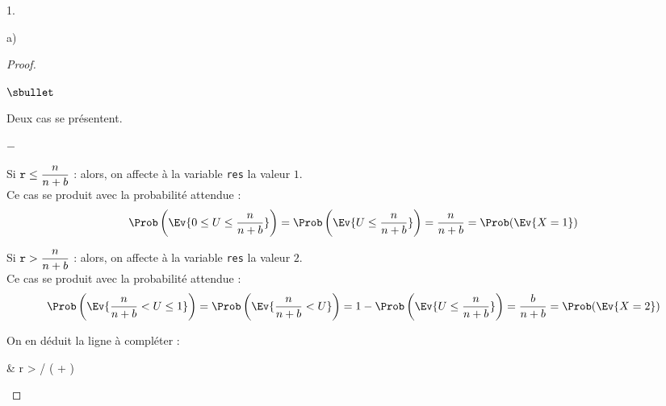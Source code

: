 \documentclass[11pt]{article}%
\begin{document}
\begin{noliste}{1.}
\begin{noliste}{a)}
\begin{proof}
\begin{noliste}{$\sbullet$}
\begin{center}
        \end{center}
        Deux cas se présentent.
        \begin{noliste}{$-$}
        \item Si $\text{\tt r} \leq \dfrac{n}{n+b}$ : alors, on
          affecte à la variable {\tt res} la valeur $1$.\\
          Ce cas se produit avec la probabilité attendue :
          \[
          \Prob\left( \Ev{0 \leq U \leq \frac{n}{n+b}} \right) =
          \Prob\left( \Ev{U \leq \frac{n}{n+b}} \right) =
          \dfrac{n}{n+b} = \Prob(\Ev{X = 1})
          \]




        \item Si $\text{\tt r} > \dfrac{n}{n+b}$ : alors, on
          affecte à la variable {\tt res} la valeur $2$.\\
          Ce cas se produit avec la probabilité attendue :
          \[
          \Prob\left( \Ev{\frac{n}{n+b} < U \leq 1} \right) =
          \Prob\left( \Ev{\frac{n}{n+b} < U} \right) = 1 -
          \Prob\left(\Ev{U \leq \frac{n}{n+b}} \right) =
          \dfrac{b}{n+b} = \Prob(\Ev{X = 2})
          \]

        \end{noliste}    

      \item On en déduit la ligne  à compléter :
        \begin{scilabC}{2}
          & \quad {} r >  / ( + )
           \nl %
        \end{scilabC}        
      \end{noliste}
 

\end{proof}
\end{noliste}
\end{noliste}
\end{document}
